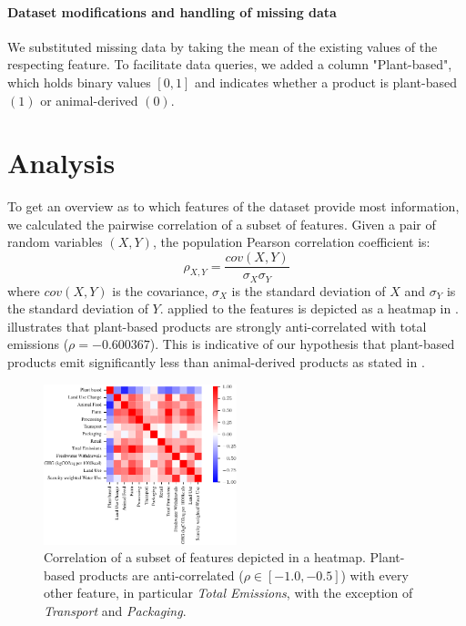 \documentclass{article}
\begin{document}
\paragraph{Dataset modifications and handling of missing data}

We substituted  missing  data by taking the mean of the existing values of the respecting feature. To facilitate data queries, we added a column "Plant-based", which holds binary values $[0,1]$ and indicates whether a product is plant-based $(1)$ or animal-derived $(0)$.


\section{Analysis}
\label{analysis}

To get an overview as to which features of the dataset provide most information, we calculated the pairwise correlation of a subset of features. Given a pair of random variables $(X,Y)$, the population Pearson correlation coefficient is: 
\begin{equation} \label{eq:corr}
  \rho_{X,Y} = \frac{cov(X,Y)}{\sigma_X \sigma_Y}
\end{equation}
where $cov(X,Y)$ is the covariance, $\sigma_X$ is the standard deviation of $X$ and $\sigma_Y$ is the standard deviation of $Y$.
 applied to the features is depicted  as a heatmap in  .   illustrates that
plant-based products are strongly anti-correlated with total emissions ($\rho =  -0.600367$). %
 This is indicative of our hypothesis that plant-based products emit significantly less than animal-derived products as stated in  .


\begin{figure}
  \centering
  \includegraphics[width=0.50\textwidth]{figures/heat-map.pdf}
  \caption{Correlation of a subset of features depicted in a heatmap. Plant-based products are  anti-correlated ($\rho \in [-1.0, -0.5]$) with every other feature, in particular \textit{Total Emissions}, with the  exception of \textit{Transport} and \textit{Packaging}.}
  \label{fig:corr}
\end{figure}
\end{document}
